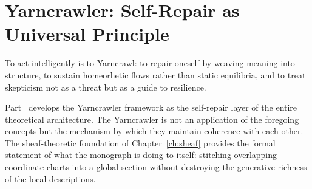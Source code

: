 \part{Yarncrawler: Self-Repair as Universal Principle}
\label{part:yarncrawler}

\epigraph{To act intelligently is to Yarncrawl: to repair oneself by weaving meaning
into structure, to sustain homeorhetic flows rather than static equilibria, and to
treat skepticism not as a threat but as a guide to resilience.}{}

\noindent Part~\ref{part:yarncrawler} develops the Yarncrawler framework as the
self-repair layer of the entire theoretical architecture. The Yarncrawler is not an
application of the foregoing concepts but the mechanism by which they maintain
coherence with each other. The sheaf-theoretic foundation of Chapter~\ref{ch:sheaf}
provides the formal statement of what the monograph is doing to itself: stitching
overlapping coordinate charts into a global section without destroying the generative
richness of the local descriptions.
\cleardoublepage
